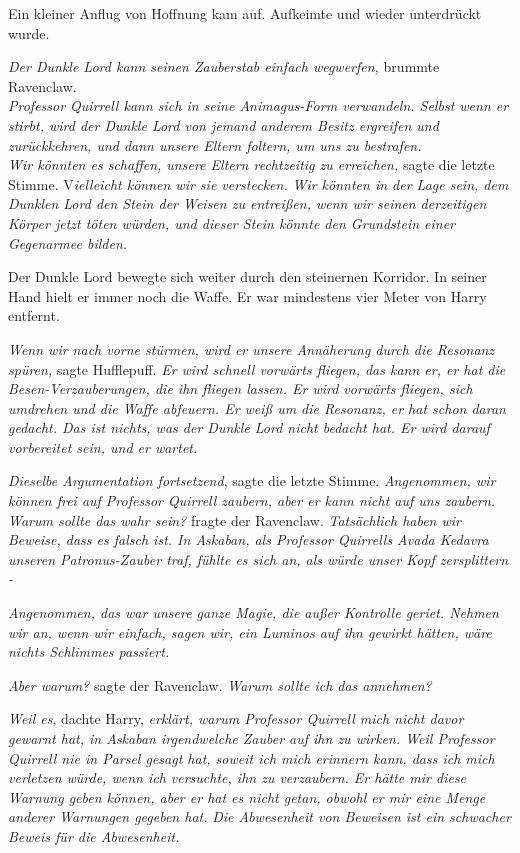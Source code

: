 {Ein kleiner Anflug von Hoffnung kam auf. Aufkeimte und wieder unterdrückt wurde.

\emph{Der Dunkle Lord kann seinen Zauberstab einfach wegwerfen,} brummte Ravenclaw.\\ \emph{Professor Quirrell kann sich in seine Animagus-Form verwandeln. Selbst wenn er stirbt, wird der Dunkle Lord von jemand anderem Besitz ergreifen und zurückkehren, und dann unsere Eltern foltern, um uns zu bestrafen.}\\ \emph{\hfill\break Wir könnten es schaffen, unsere Eltern rechtzeitig zu erreichen,} sagte die letzte Stimme. V\emph{ielleicht können wir sie verstecken.} \emph{Wir könnten in der Lage sein, dem Dunklen Lord den Stein der Weisen zu entreißen, wenn wir seinen derzeitigen Körper jetzt töten würden, und dieser Stein könnte den Grundstein einer Gegenarmee bilden.}

Der Dunkle Lord bewegte sich weiter durch den steinernen Korridor. In seiner Hand hielt er immer noch die Waffe. Er war mindestens vier Meter von Harry entfernt.

\emph{Wenn wir nach vorne stürmen, wird er unsere Annäherung durch die Resonanz spüren,} sagte Hufflepuff. \emph{Er wird schnell vorwärts fliegen, das kann er, er hat die Besen-Verzauberungen, die ihn fliegen lassen. Er wird vorwärts fliegen, sich umdrehen und die Waffe abfeuern. Er weiß um die Resonanz, er hat schon daran gedacht. Das ist nichts, was der Dunkle Lord nicht bedacht hat. Er wird darauf vorbereitet sein, und er wartet.}

\emph{Dieselbe Argumentation fortsetzend}, sagte die letzte Stimme. \emph{Angenommen, wir können frei auf Professor Quirrell zaubern, aber er kann nicht auf uns zaubern.}\\ \emph{\hfill\break Warum sollte das wahr sein?} fragte der Ravenclaw. \emph{Tatsächlich haben wir Beweise, dass es falsch ist. In Askaban, als Professor Quirrells Avada Kedavra unseren Patronus-Zauber traf, fühlte es sich an, als würde unser Kopf zersplittern -}

\emph{Angenommen, das war unsere ganze Magie, die außer Kontrolle geriet. Nehmen wir an, wenn wir einfach, sagen wir, ein Luminos auf ihn gewirkt hätten, wäre nichts Schlimmes passiert.}

\emph{Aber warum?} sagte der Ravenclaw. \emph{Warum sollte ich das annehmen?}

\emph{Weil es}, dachte Harry, \emph{erklärt, warum Professor Quirrell mich nicht davor gewarnt hat, in Askaban irgendwelche Zauber auf ihn zu wirken. Weil Professor Quirrell nie in Parsel gesagt hat, soweit ich mich erinnern kann, dass ich mich verletzen würde, wenn ich versuchte, ihn zu verzaubern. Er hätte mir diese Warnung geben können, aber er hat es nicht getan, obwohl er mir eine Menge anderer Warnungen gegeben hat.} \emph{Die Abwesenheit von Beweisen ist ein schwacher Beweis für die Abwesenheit.}

}
